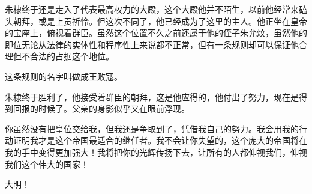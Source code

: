 \begin{multicols}{\theparacolNo}
		朱棣终于还是走入了代表最高权力的大殿，这个大殿他并不陌生，以前他经常来磕头朝拜，或是上贡祈怜。但这次不同了，他已经成为了这里的主人。他正坐在皇帝的宝座上，俯视着群臣。虽然这个位置不久之前还属于他的侄子朱允炆，虽然他的即位无论从法律的实体性和程序性上来说都不正常，但有一条规则却可以保证他合理但不合法的占据这个地位。

		这条规则的名字叫做成王败寇。

		朱棣终于胜利了，他接受着群臣的朝拜，这是他应得的，他付出了努力，现在是得到回报的时候了。父亲的身影似乎又在眼前浮现。

		你虽然没有把皇位交给我，但我还是争取到了，凭借我自己的努力。我会用我的行动证明我才是这个帝国最适合的继任者。我不会让你失望的，这个庞大的帝国将在我的手中变得更加强大！我将把你的光辉传扬下去，让所有的人都仰视我们，仰视我们这个伟大的国家！

		大明！
		\ifnum{}
	\end{multicols}
\fi
